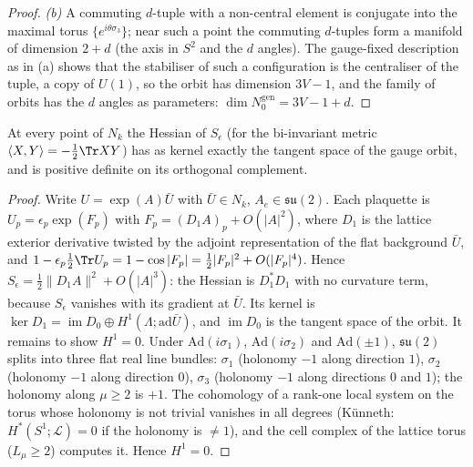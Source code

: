 \begin{proof}
\emph{(b)} A commuting $d$-tuple with a non-central element is conjugate into the maximal torus $\{e^{i\theta\sigma_3}\}$; near such a point the commuting $d$-tuples form a manifold of dimension $2+d$ (the axis in $S^2$ and the $d$ angles). The gauge-fixed description as in (a) shows that the stabiliser of such a configuration is the centraliser of the tuple, a copy of $U(1)$, so the orbit has dimension $3V-1$, and the family of orbits has the $d$ angles as parameters: $\dim N_0^{\mathrm{gen}}=3V-1+d$.
\end{proof}

\begin{lemma}\label{lem:B}
At every point of $N_k$ the Hessian of $S_\epsilon$ (for the bi-invariant metric $\langle X,Y\rangle=-\frac12\Tr XY$) has as kernel exactly the tangent space of the gauge orbit, and is positive definite on its orthogonal complement.
\end{lemma}
\begin{proof}
Write $U=\exp(A)\bar U$ with $\bar U\in N_k$, $A_e\in\mathfrak{su}(2)$. Each plaquette is $U_p=\epsilon_p\exp(F_p)$ with $F_p=(D_1A)_p+O(|A|^2)$, where $D_1$ is the lattice exterior derivative twisted by the adjoint representation of the flat background $\bar U$, and $1-\epsilon_p\frac12\Tr U_p=1-\cos|F_p|=\frac12|F_p|^2+O(|F_p|^4)$. Hence $S_\epsilon=\frac12\|D_1A\|^2+O(|A|^3)$: the Hessian is $D_1^*D_1$ with no curvature term, because $S_\epsilon$ vanishes with its gradient at $\bar U$. Its kernel is $\ker D_1=\operatorname{im}D_0\oplus H^1(\Lambda;\mathrm{ad}\bar U)$, and $\operatorname{im}D_0$ is the tangent space of the orbit. It remains to show $H^1=0$. Under $\mathrm{Ad}(i\sigma_1)$, $\mathrm{Ad}(i\sigma_2)$ and $\mathrm{Ad}(\pm1)$, $\mathfrak{su}(2)$ splits into three flat real line bundles: $\sigma_1$ (holonomy $-1$ along direction $1$), $\sigma_2$ (holonomy $-1$ along direction $0$), $\sigma_3$ (holonomy $-1$ along directions $0$ and $1$); the holonomy along $\mu\ge2$ is $+1$. The cohomology of a rank-one local system on the torus whose holonomy is not trivial vanishes in all degrees (K\"unneth: $H^*(S^1;\mathcal L)=0$ if the holonomy is $\ne1$), and the cell complex of the lattice torus ($L_\mu\ge2$) computes it. Hence $H^1=0$.
\end{proof}

